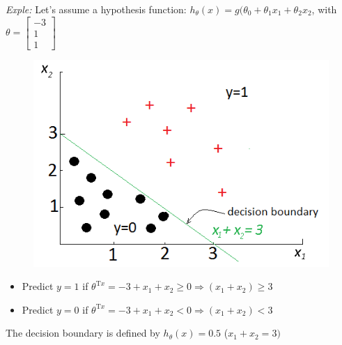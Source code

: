 \documentclass[a4paper,12pt]{report}
\begin{document}
\textit{Exple:} Let's assume a hypothesis function: $h_{\theta}(x) = g(\theta_0 + \theta_1 x_1 + \theta_2 x_2$, with $\theta=\left[ \begin{smallmatrix} -3\\ 1\\1 \end{smallmatrix} \right]$
\begin{figure}[H]
	\centering
        \includegraphics[totalheight=5 cm]{boundary.png}
\end{figure}
\begin{itemize}
				\item Predict $y=1$ if $\theta^{\mathrm{T}x} = -3+x_1+x_2 \geq 0 \Rightarrow (x_1+x_2) \geq 3$
				\item Predict $y=0$ if $\theta^{\mathrm{T}x} = -3+x_1+x_2 < 0 \Rightarrow (x_1+x_2) < 3$
				\end{itemize} 
The decision boundary is defined by $h_{\theta}(x) = 0.5$ ($x_1 + x_2 = 3)$	

			  
\end{document}
